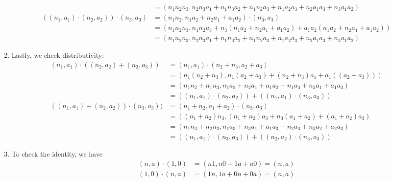 \documentclass[12pt,letterpaper]{article}
\theoremstyle{definition}
\begin{document}
\begin{enumerate}
\begin{align*}
          &= (n_{1}n_{2}n_{3}, n_{2}n_{3}a_{1} + n_{1}n_{3}a_{2} + n_{1}n_{2}a_{3} + n_{1}a_{2}a_{3} + n_{2}a_{1}a_{3} + n_{3}a_{1}a_{2}) \\
          ((n_{1}, a_{1}) \cdot (n_{2}, a_{2})) \cdot (n_{3}, a_{3}) &= (n_{1}n_{2}, n_{1}a_{2} + n_{2}a_{1} + a_{1}a_{2}) \cdot (n_{3}, a_{3}) \\
                                                                     &= (n_{1}n_{2}n_{3}, n_{1}n_{2}a_{3} + n_{3}(n_{1}a_{2} + n_{2}a_{1} + a_{1}a_{2}) + a_{1}a_{2}(n_{1}a_{2} + n_{2}a_{1} + a_{1}a_{2})) \\
          &= (n_{1}n_{2}n_{3}, n_{2}n_{3}a_{1} + n_{1}n_{3}a_{2} + n_{1}n_{2}a_{3} + n_{1}a_{2}a_{3} + n_{2}a_{1}a_{3} + n_{3}a_{1}a_{2})
        \end{align*}
  \item Lastly, we check distributivity:
        \begin{align*}
          (n_{1}, a_{1}) \cdot ((n_{2}, a_{2}) + (n_{3}, a_{3})) &= (n_{1}, a_{1}) \cdot (n_{2} + n_{3}, a_{2} + a_{3}) \\
                                                                 &= (n_{1}(n_{2} + n_{3}), n_{1}(a_{2} + a_{3}) + (n_{2} + n_{3})a_{1} + a_{1}((a_{2} + a_{3}))) \\
                                                                 &= (n_{1}n_{2} + n_{1}n_{3}, n_{1}a_{2} + n_{2}a_{1} + a_{1}a_{2} + n_{1}a_{3} + n_{3}a_{1} + a_{1}a_{3}) \\
                                                                 &= ((n_{1}, a_{1}) \cdot (n_{2}, a_{2})) + ((n_{1}, a_{1}) \cdot (n_{3}, a_{3})) \\
          ((n_{1}, a_{1}) + (n_{2}, a_{2})) \cdot (n_{3}, a_{3})) &= (n_{1} + n_{2}, a_{1} + a_{2}) \cdot (n_{3}, a_{3}) \\
                                                                 &= ((n_{1} + n_{2})n_{3}, (n_{1} + n_{2})a_{3} + n_{3}(a_{1} + a_{2}) + (a_{1} + a_{2})a_{3}) \\
                                                                 &= (n_{1}n_{3} + n_{2}n_{3}, n_{1}a_{3} + n_{3}a_{1} + a_{1}a_{3} + n_{2}a_{3} + n_{3}a_{2} + a_{2}a_{3}) \\
                                                                 &= ((n_{1}, a_{1}) \cdot (n_{3}, a_{3})) + ((n_{2}, a_{2}) \cdot (n_{3}, a_{3}))
        \end{align*}
  \item To check the identity, we have
        \begin{align*}
          (n, a) \cdot (1, 0) &= (n1, n0 + 1a + a0) = (n, a) \\
          (1, 0) \cdot (n, a) &= (1n, 1a + 0n + 0a) = (n, a) \\
        \end{align*}
\end{enumerate}
\end{document}
